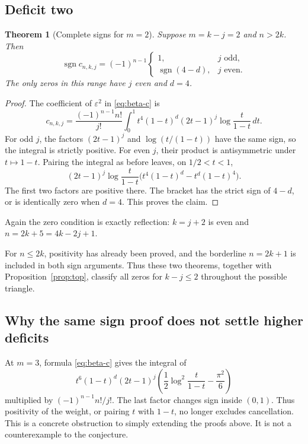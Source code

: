 \documentclass[11pt]{article}
\numberwithin{equation}{section}
\newtheorem{theorem}{Theorem}[section]
\theoremstyle{definition}
\theoremstyle{remark}
\DeclareMathOperator{\sgn}{sgn}
\begin{document}
\subsection{Deficit two}
\begin{theorem}[Complete signs for $m=2$]\label{thm:m2}
Suppose $m=k-j=2$ and $n>2k$. Then
\begin{equation}\label{eq:m2-sign}
 \sgn c_{n,k,j}=(-1)^{n-1}
 \begin{cases}
 1,&j\text{ odd},\\
 \sgn(4-d),&j\text{ even}.
 \end{cases}
\end{equation}
The only zeros in this range have $j$ even and $d=4$.
\end{theorem}
\begin{proof}
The coefficient of $\varepsilon^2$ in \eqref{eq:beta-c} is
\begin{equation}\label{eq:m2-integral}
 c_{n,k,j}=\frac{(-1)^{n-1}n!}{j!}
 \int_0^1t^4(1-t)^d(2t-1)^j
       \log\frac{t}{1-t}\,dt.
\end{equation}
For odd $j$, the factors $(2t-1)^j$ and $\log(t/(1-t))$ have the same
sign, so the integral is strictly positive. For even $j$, their product
is antisymmetric under $t\mapsto1-t$. Pairing the integral as before
leaves, on $1/2<t<1$,
\[
 (2t-1)^j\log\frac{t}{1-t}
 \bigl(t^4(1-t)^d-t^d(1-t)^4\bigr).
\]
The first two factors are positive there. The bracket has the strict
sign of $4-d$, or is identically zero when $d=4$. This proves the claim.
\end{proof}
Again the zero condition is exactly reflection: $k=j+2$ is even and
$n=2k+5=4k-2j+1$.

For $n\le2k$, positivity has already been proved, and the borderline
$n=2k+1$ is included in both sign arguments. Thus these two theorems,
together with Proposition~\ref{prop:top}, classify all zeros for
$k-j\le2$ throughout the possible triangle.

\subsection{Why the same sign proof does not settle higher deficits}
At $m=3$, formula \eqref{eq:beta-c} gives the integral of
\begin{equation}\label{eq:m3-kernel}
 t^6(1-t)^d(2t-1)^j
 \left(\frac12\log^2\frac{t}{1-t}-\frac{\pi^2}{6}\right)
\end{equation}
multiplied by $(-1)^{n-1}n!/j!$. The last factor changes sign inside
$(0,1)$. Thus positivity of the weight, or pairing $t$ with $1-t$, no
longer excludes cancellation. This is a concrete obstruction to simply
extending the proofs above. It is not a counterexample to the conjecture.
\end{document}

